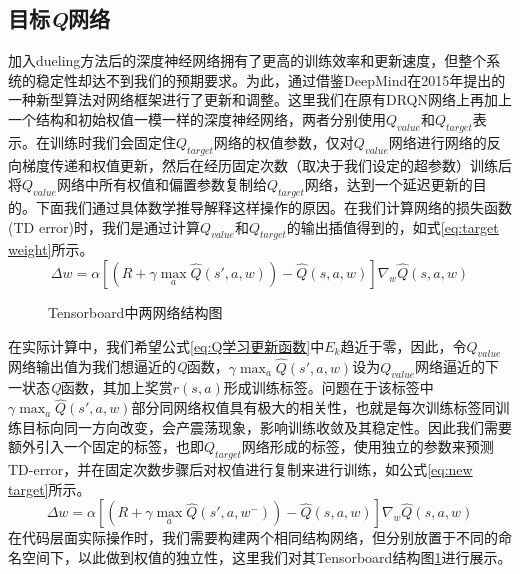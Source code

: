 \subsection{目标\textit{Q}网络}
加入dueling方法后的深度神经网络拥有了更高的训练效率和更新速度，但整个系统的稳定性却达不到我们的预期要求。为此，通过借鉴DeepMind在2015年提出的一种新型算法对网络框架进行了更新和调整。这里我们在原有DRQN网络上再加上一个结构和初始权值一模一样的深度神经网络，两者分别使用$Q_{value}$和$Q_{target}$表示。在训练时我们会固定住$Q_{target}$网络的权值参数，仅对$Q_{value}$网络进行网络的反向梯度传递和权值更新，然后在经历固定次数（取决于我们设定的超参数）训练后将$Q_{value}$网络中所有权值和偏置参数复制给$Q_{target}$网络，达到一个延迟更新的目的。下面我们通过具体数学推导解释这样操作的原因。在我们计算网络的损失函数(TD error)时，我们是通过计算$Q_{value}$和$Q_{target}$的输出插值得到的，如式\ref{eq:target weight}所示。
\begin{equation}\label{eq:target weight}
\Delta w=\alpha\left [ \left ( R+\gamma\max _{a} \hat{Q}\left ( {s}' ,a,w\right )\right )- \hat{Q}\left ( s ,a,w\right )\right ]\nabla_{w}\hat{Q}\left ( s,a,w \right )
\end{equation}
\begin{figure}[htbp]
	\begin{minipage}{\textwidth}
		\centering
		\subfigure{\label{fig:tensorboard_q_net}}\addtocounter{subfigure}{-2}
		\hspace{1em}
		\subfigure{\label{fig:tensorboard_q_target}}\addtocounter{subfigure}{-2}
		\hspace{1em}	
	\end{minipage}
	\vspace{0.2em}
	\caption{Tensorboard中两网络结构图}\label{fig:target网络}
\end{figure}
在实际计算中，我们希望公式\ref{eq:Q学习更新函数}中$E_{k}$趋近于零，因此，令$Q_{value}$网络输出值为我们想逼近的\textit{Q}函数，$\gamma\max _{a} \hat{Q}\left ( {s}' ,a,w\right )$设为$Q_{value}$网络逼近的下一状态\textit{Q}函数，其加上奖赏$r(s,a)$形成训练标签。问题在于该标签中$\gamma\max_{a}\hat{Q}\left ( {s}' ,a,w \right )$部分同网络权值具有极大的相关性，也就是每次训练标签同训练目标向同一方向改变，会产震荡现象，影响训练收敛及其稳定性。因此我们需要额外引入一个固定的标签，也即$Q_{target}$网络形成的标签，使用独立的参数来预测TD-error，并在固定次数步骤后对权值进行复制来进行训练，如公式\ref{eq:new target}所示。
\begin{equation}\label{eq:new target}
\Delta w=\alpha\left [ \left ( R+\gamma\max _{a} \hat{Q}\left ( {s}' ,a,w^{-}\right )\right )- 	\hat{Q}\left ( s ,a,w\right )\right ]\nabla_{w}\hat{Q}\left ( s,a,w \right )
\end{equation}
在代码层面实际操作时，我们需要构建两个相同结构网络，但分别放置于不同的命名空间下，以此做到权值的独立性，这里我们对其Tensorboard结构图\ref{fig:target网络}进行展示。

